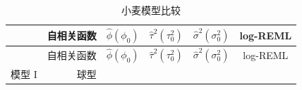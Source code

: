 \documentclass[12pt,a4paper,UTF8,twoside]{book}
\theoremstyle{definition}
\theoremstyle{definition}
\theoremstyle{definition}
\theoremstyle{remark}
\begin{document}
\begin{longtable}[]{@{}lrrrrc@{}}
\caption{\label{tab:yields-model-compare} 小麦模型比较}\tabularnewline
\toprule
\begin{minipage}[b]{0.08\columnwidth}\raggedright
\strut
\end{minipage} & \begin{minipage}[b]{0.08\columnwidth}\raggedleft
自相关函数\strut
\end{minipage} & \begin{minipage}[b]{0.18\columnwidth}\raggedleft
\(\hat{\phi}(\phi_0)\)\strut
\end{minipage} & \begin{minipage}[b]{0.20\columnwidth}\raggedleft
\(\hat{\tau}^2(\tau^2_{0})\)\strut
\end{minipage} & \begin{minipage}[b]{0.19\columnwidth}\raggedleft
\(\hat{\sigma}^2(\sigma^2_{0})\)\strut
\end{minipage} & \begin{minipage}[b]{0.09\columnwidth}\centering
log-REML\strut
\end{minipage}\tabularnewline
\midrule
\endfirsthead
\toprule
\begin{minipage}[b]{0.08\columnwidth}\raggedright
\strut
\end{minipage} & \begin{minipage}[b]{0.08\columnwidth}\raggedleft
自相关函数\strut
\end{minipage} & \begin{minipage}[b]{0.18\columnwidth}\raggedleft
\(\hat{\phi}(\phi_0)\)\strut
\end{minipage} & \begin{minipage}[b]{0.20\columnwidth}\raggedleft
\(\hat{\tau}^2(\tau^2_{0})\)\strut
\end{minipage} & \begin{minipage}[b]{0.19\columnwidth}\raggedleft
\(\hat{\sigma}^2(\sigma^2_{0})\)\strut
\end{minipage} & \begin{minipage}[b]{0.09\columnwidth}\centering
log-REML\strut
\end{minipage}\tabularnewline
\midrule
\endhead
\begin{minipage}[t]{0.08\columnwidth}\raggedright
模型 I\strut
\end{minipage} & \begin{minipage}[t]{0.08\columnwidth}\raggedleft
球型\strut
\end{minipage} & \begin{minipage}[t]{0.18\columnwidth}\raggedleft

\end{minipage}
\end{longtable}
\end{document}
